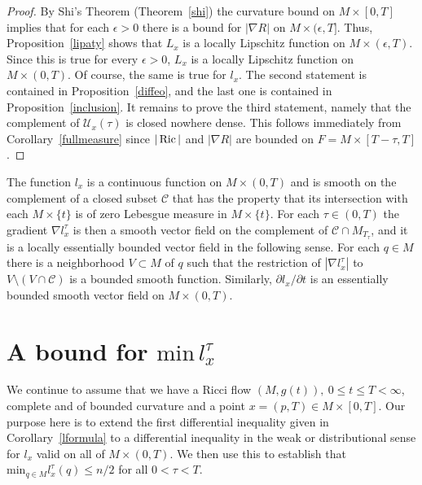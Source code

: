 \begin{proof}\sketch
{}
By Shi's Theorem (Theorem~\ref{shi}) the curvature bound on $M\times
[0,T]$ implies that for each $\epsilon>0$ there is a bound for
$|\nabla R|$ on $M\times (\epsilon,T]$. Thus,
Proposition~\ref{lipaty} shows that $L_{x}$ is a
 locally Lipschitz function on $M\times (\epsilon,T)$. Since this is
true for every $\epsilon>0$, $L_x$ is a locally Lipschitz function
on $M\times (0,T)$. Of course, the same is true for $l_{x}$. The
second statement is contained in Proposition~\ref{diffeo}, and the
last one is contained in Proposition~\ref{inclusion}. It remains to
prove the third statement, namely that the complement of ${\mathcal
U}_{x}(\tau)$ is closed nowhere dense. This follows immediately from
Corollary~\ref{fullmeasure} since $|\operatorname{Ric}|$ and $|\nabla R|$ are
bounded on $F=M\times [T-\tau,T]$.
\end{proof}

\begin{corollary}
\label{cor:l-continuous-ae-smooth}

The function $l_x$ is a continuous function on $M\times (0,T)$ and
is smooth on the complement of a closed subset ${\mathcal C}$ that
has the property that its intersection with each $M\times \{t\}$ is
of zero Lebesgue measure in $M\times \{t\}$. For each $\tau\in
(0,T)$ the gradient $\nabla l^\tau_x$ is then a smooth vector field
on the complement of ${\mathcal C}\cap M_{T_\tau}$, and it is a
locally essentially bounded vector field in the following sense. For
each $q\in M$ there is a neighborhood $V\subset M$ of $q$ such that
the restriction of $|\nabla l_x^\tau|$ to $V\setminus\left(V\cap
{\mathcal C}\right)$ is a bounded smooth function. Similarly,
$\partial l_x/\partial t$ is an essentially bounded smooth vector
field on $M\times (0,T)$.
\end{corollary}

\section{A bound for $\mathrm{min}\, l^\tau_x$}

We continue to assume that we have a Ricci flow $(M,g(t)),\ 0\le
t\le T<\infty$, complete and of bounded curvature and a point
$x=(p,T)\in M\times [0,T]$. Our purpose here is to extend the first
differential inequality given in
 Corollary~\ref{lformula} to a differential
inequality in the weak or distributional sense for $l_{x}$ valid on
all of $M\times (0,T)$. We then use this to establish that $\mathrm{min}_{q\in M} l^\tau_{x}(q)\le n/2$ for all $0<\tau<T$.

